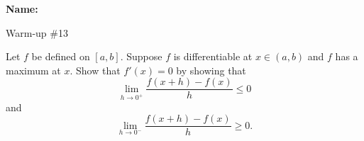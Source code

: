 \documentclass[12pt]{article}
\begin{document}
\noindent \textbf{Name:} 

\begin{center}
Warm-up \#13
\end{center}

\noindent Let $f$ be defined on $[a,b]$. Suppose $f$ is differentiable at $x \in (a,b)$ and $f$ has a maximum at $x$. Show that $f'(x) = 0$ by showing that 
\[
\lim_{h \to 0^+} \frac{f(x + h) - f(x)}{h} \leqslant 0
\]
and 
\[
\lim_{h \to 0^-} \frac{f(x + h) - f(x)}{h} \geqslant 0.
\]
\end{document}
